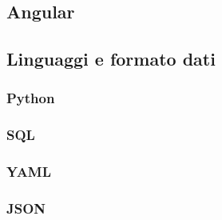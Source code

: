 \subsection{Angular}

\subsection{Linguaggi e formato dati}
\subsubsection{Python}

\subsubsection{SQL}

\subsubsection{YAML}

\subsubsection{JSON}